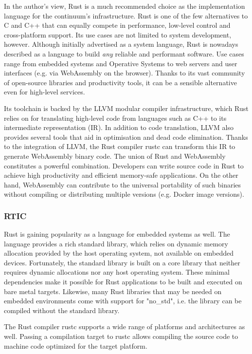 In the author's view, Rust is a much recommended choice as the implementation language for the continuum's infrastructure. Rust is one of the few alternatives to C and C++ that can equally compete in performance, low-level control and cross-platform support. Its use cases are not limited to system development, however. Although initially advertised as a system language, Rust is nowadays described as a language to build \emph{any} reliable and performant software. Use cases range from embedded systems and Operative Systems to web servers and user interfaces (e.g. via WebAssembly on the browser). Thanks to its vast community of open-source libraries and productivity tools, it can be a sensible alternative even for high-level services.

Its toolchain is backed by the LLVM modular compiler infrastructure, which Rust relies on for translating high-level code from languages such as C++ to its intermediate representation (IR). In addition to code translation, LLVM also provides several tools that aid in optimisation and dead code elimination. Thanks to the integration of LLVM, the Rust compiler rustc can transform this IR to generate WebAssembly binary code. The union of Rust and WebAssembly constitutes a powerful combination. Developers can write source code in Rust to achieve high productivity and efficient memory-safe applications. On the other hand, WebAssembly can contribute to the universal portability of such binaries without compiling or distributing multiple versions (e.g. Docker image versions). 

\subsubsection{RTIC}

Rust is gaining popularity as a language for embedded systems as well. The language provides a rich standard library, which relies on dynamic memory allocation provided by the host operating system, not available on embedded devices. Fortunately, the standard library is built on a core library that neither requires dynamic allocations nor any host operating system. These minimal dependencies make it possible for Rust applications to be built and executed on bare metal targets. Likewise, many Rust libraries that may be needed on embedded environments come with support for "no\_std", i.e. the library can be compiled without the standard library. 

The Rust compiler rustc supports a wide range of platforms and architectures as well. Passing a compilation target to rustc allows compiling the source code to machine code optimized for the target platform.

